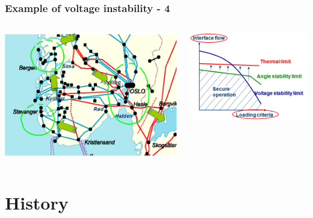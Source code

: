\documentclass{beamer}
\begin{document}
\begin{frame}
\frametitle{Example of voltage instability - 4}
\begin{columns}
\begin{column}{0.5\textwidth}
\includegraphics[width=1\textwidth]{Figs/Hasle.png}    
\end{column}
\begin{column}{0.5\textwidth}
\includegraphics[width=1\textwidth]{Figs/SecurityLimits_emphasis.png}
\end{column}
\end{columns}  
\end{frame}


\section{History}
\end{document}

